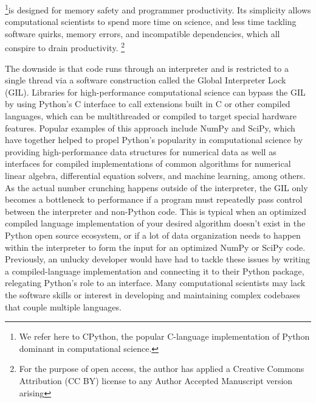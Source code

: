 \documentclass{IEEEcsmag}
\newcommand\blfootnote[1]{%
  \begingroup
  \renewcommand\thefootnote{}\footnote{#1}%
  \addtocounter{footnote}{-1}%
  \endgroup
}
\begin{document}
\maketitle
{}\footnote{We refer here to CPython, the popular C-language implementation of Python dominant in computational science.}is designed for memory safety and programmer productivity. Its simplicity allows computational scientists to spend more time on science, and less time tackling software quirks, memory errors, and incompatible dependencies, which all conspire to drain productivity.\blfootnote{For the purpose of open access, the author has applied a Creative Commons Attribution (CC BY) license to any Author Accepted Manuscript version arising} 
The downside is that code runs through an interpreter and is restricted to a single thread via a software construction called the Global Interpreter Lock (GIL). Libraries for high-performance computational science can bypass the GIL by using Python's C interface to call extensions built in C or other compiled languages, which can be multithreaded or compiled to target special hardware features. Popular examples of this approach include NumPy and SciPy, which have together helped to propel Python's popularity in computational science by providing high-performance data structures for numerical data as well as interfaces for compiled implementations of common algorithms for numerical linear algebra, differential equation solvers, and machine learning, among others.
As the actual number crunching happens outside of the interpreter, the GIL only becomes a bottleneck to performance if a program must repeatedly pass control between the interpreter and non-Python code. This is  typical when an optimized compiled language implementation of your desired algorithm doesn't exist in the Python open source ecosystem, or if a lot of data organization needs to happen within the interpreter to form the input for an optimized NumPy or SciPy code. Previously, an unlucky developer would have had to tackle these issues by writing a compiled-language implementation and connecting it to their Python package, relegating Python's role to an interface. Many computational scientists may lack the software skills or interest in developing and maintaining complex codebases that couple multiple languages.
\end{document}
